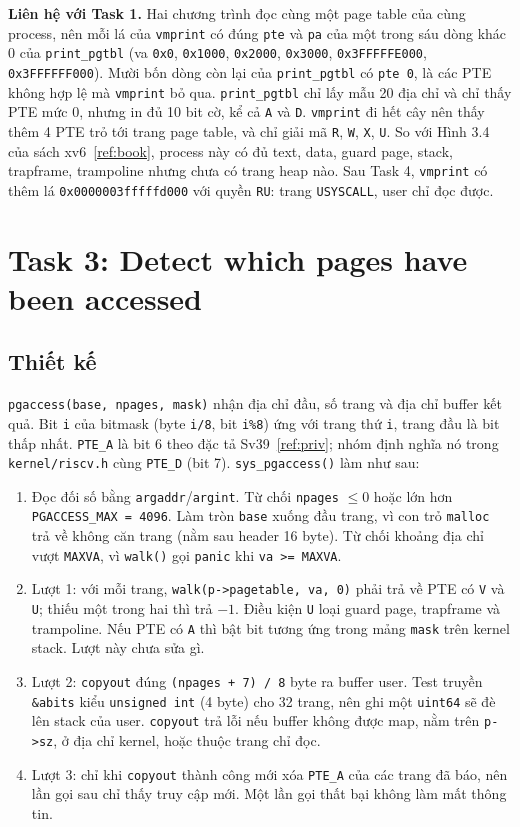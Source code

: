 \documentclass[10pt,a4paper]{article}
\newcommand{\cc}[1]{\texttt{#1}}
\begin{document}
\textbf{Liên hệ với Task 1.} Hai chương trình đọc cùng một page table của cùng process, nên mỗi lá của \cc{vmprint} có đúng \cc{pte} và \cc{pa} của một trong sáu dòng khác 0 của \cc{print\_pgtbl} (va \cc{0x0}, \cc{0x1000}, \cc{0x2000}, \cc{0x3000}, \cc{0x3FFFFFE000}, \cc{0x3FFFFFF000}). Mười bốn dòng còn lại của \cc{print\_pgtbl} có \cc{pte 0}, là các PTE không hợp lệ mà \cc{vmprint} bỏ qua. \cc{print\_pgtbl} chỉ lấy mẫu 20 địa chỉ và chỉ thấy PTE mức 0, nhưng in đủ 10 bit cờ, kể cả \cc{A} và \cc{D}. \cc{vmprint} đi hết cây nên thấy thêm 4 PTE trỏ tới trang page table, và chỉ giải mã \cc{R}, \cc{W}, \cc{X}, \cc{U}. So với Hình 3.4 của sách xv6~\ref{ref:book}, process này có đủ text, data, guard page, stack, trapframe, trampoline nhưng chưa có trang heap nào. Sau Task 4, \cc{vmprint} có thêm lá \cc{0x0000003fffffd000} với quyền \cc{RU}: trang \cc{USYSCALL}, user chỉ đọc được.

\section{Task 3: Detect which pages have been accessed}\label{sec:task3}

\subsection{Thiết kế}
\cc{pgaccess(base, npages, mask)} nhận địa chỉ đầu, số trang và địa chỉ buffer kết quả. Bit \cc{i} của bitmask (byte \cc{i/8}, bit \cc{i\%8}) ứng với trang thứ \cc{i}, trang đầu là bit thấp nhất. \cc{PTE\_A} là bit 6 theo đặc tả Sv39~\ref{ref:priv}; nhóm định nghĩa nó trong \cc{kernel/riscv.h} cùng \cc{PTE\_D} (bit 7). \cc{sys\_pgaccess()} làm như sau:
\begin{enumerate}
  \item Đọc đối số bằng \cc{argaddr}/\cc{argint}. Từ chối \cc{npages} $\le 0$ hoặc lớn hơn \cc{PGACCESS\_MAX = 4096}. Làm tròn \cc{base} xuống đầu trang, vì con trỏ \cc{malloc} trả về không căn trang (nằm sau header 16 byte). Từ chối khoảng địa chỉ vượt \cc{MAXVA}, vì \cc{walk()} gọi \cc{panic} khi \cc{va >= MAXVA}.
  \item Lượt 1: với mỗi trang, \cc{walk(p->pagetable, va, 0)} phải trả về PTE có \cc{V} và \cc{U}; thiếu một trong hai thì trả $-1$. Điều kiện \cc{U} loại guard page, trapframe và trampoline. Nếu PTE có \cc{A} thì bật bit tương ứng trong mảng \cc{mask} trên kernel stack. Lượt này chưa sửa gì.
  \item Lượt 2: \cc{copyout} đúng \cc{(npages + 7) / 8} byte ra buffer user. Test truyền \cc{\&abits} kiểu \cc{unsigned int} (4 byte) cho 32 trang, nên ghi một \cc{uint64} sẽ đè lên stack của user. \cc{copyout} trả lỗi nếu buffer không được map, nằm trên \cc{p->sz}, ở địa chỉ kernel, hoặc thuộc trang chỉ đọc.
  \item Lượt 3: chỉ khi \cc{copyout} thành công mới xóa \cc{PTE\_A} của các trang đã báo, nên lần gọi sau chỉ thấy truy cập mới. Một lần gọi thất bại không làm mất thông tin.
\end{enumerate}
\end{document}
